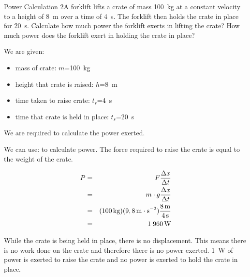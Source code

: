 \begin{wex}{Power Calculation 2}{A forklift lifts a crate of mass 100~kg at a constant velocity to a height of 8~m over a time of 4~s. The forklift then holds the crate in place for 20~s. Calculate how much power the forklift exerts in lifting the crate? How much power does the forklift exert in holding the crate in place?}
{
We are given:
\begin{itemize}
\item{mass of crate: $m$=100~kg}
\item{height that crate is raised: $h$=8~m}
\item{time taken to raise crate: $t_r$=4~s}
\item{time that crate is held in place: $t_s$=20~s}
\end{itemize}
We are required to calculate the power exerted.

We can use:
to calculate power. The force required to raise the crate is equal to the weight of the crate.

\begin{eqnarray*}
P&=&F\frac{\Delta x}{\Delta t}\\
&=&m\cdot g\frac{\Delta x}{\Delta t}\\
&=&(100\,\mathrm{kg})(9,8\,\mathrm{m \cdot s^{-2}})\frac{8\,\rm{m}}{4\,\mathrm{s}}\\
&=&1\;960\,\mathrm{W}
\end{eqnarray*}

While the crate is being held in place, there is no displacement. This means there is no work done on the crate and therefore there is no power exerted.
1~W of power is exerted to raise the crate and no power is exerted to hold the crate in place.
}
\end{wex}


